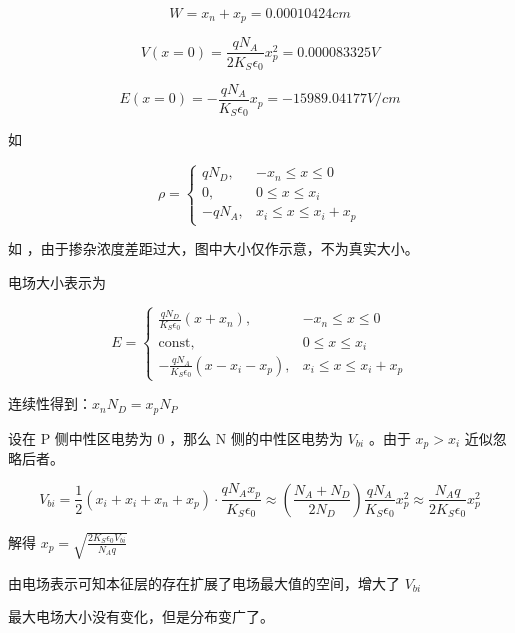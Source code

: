 \documentclass[lang=cn,11pt,a4paper,cite=authoryear]{elegantpaper}
\begin{document}
\[W = x_n + x_p = 0.00010424 cm\]


\[V(x=0) = \frac{q N_A }{2 K_S \epsilon_0} x_p^2 = 0.000083325 V\]

\[E(x=0) = - \frac{qN_A}{K_S \epsilon_0}x_p = -15989.04177 V/cm\]


如 




\[\rho = \left\{
\begin{aligned}
    q N_D , & -x_n \leq x \leq 0\\
    0, & 0 \leq x \leq x_i\\ 
    -q N_A, & x_i \leq x \leq x_i + x_p 
\end{aligned}    
\right.\]

如 ，由于掺杂浓度差距过大，图中大小仅作示意，不为真实大小。


电场大小表示为 

\[
E = \left\{
\begin{aligned}
    \frac{q N_D}{K_S \epsilon_0} (x+x_n), & -x_n \leq x \leq 0 \\
    \text{const}, & 0 \leq x \leq x_i \\ 
    -\frac{q N_A}{K_S \epsilon_0} (x - x_i - x_p), & x_i \leq x \leq x_i + x_p
\end{aligned}    
\right.    
\]

连续性得到：\(x_n N_D = x_p N_P\) 

设在 P 侧中性区电势为 \(0\) ，那么 N 侧的中性区电势为 \(V_{bi}\) 。由于 \(x_p > x_i\) 近似忽略后者。

\[V_{bi} = \frac{1}{2} (x_i + x_i + x_n + x_p) \cdot \frac{q N_A x_p}{K_S \epsilon_0} \approx (\frac{N_A + N_D}{2 N_D}) \frac{q N_A}{K_S \epsilon_0} x_p^2 \approx \frac{N_A q}{2 K_S \epsilon_0} x_p^2 \]

解得 \(x_p = \sqrt{\frac{2 K_S \epsilon_0 V_{bi}}{N_A q}}\)


由电场表示可知本征层的存在扩展了电场最大值的空间，增大了 \(V_{bi}\)


最大电场大小没有变化，但是分布变广了。









\end{document}

